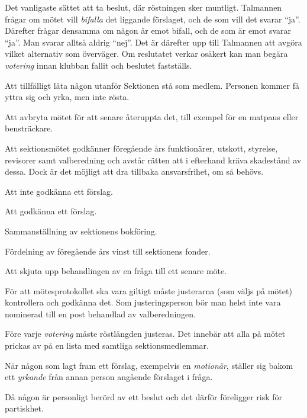 \documentclass[../_main/handlingar.tex]{subfiles}
\begin{document}
\begin{description}[style=multiline, leftmargin=45mm]
    \item[Acklamation]
    Det vanligaste sättet att ta beslut, där röstningen sker muntligt. Talmannen frågar om mötet vill \emph{bifalla} det liggande förslaget, och de som vill det svarar ``ja''. Därefter frågar densamma om någon är emot bifall, och de som är emot svarar ``ja''. Man svarar alltså aldrig ``nej''. Det är därefter upp till Talmannen att avgöra vilket alternativ som överväger. Om reslutatet verkar osäkert kan man begära \emph{votering} innan klubban fallit och beslutet fastställs.
    \item[Adjungera]
    Att tillfälligt låta någon utanför Sektionen stå som medlem. Personen kommer få yttra sig och yrka, men inte rösta.
    \item[Ajournera]
    Att avbryta mötet för att senare återuppta det, till exempel för en matpaus eller bensträckare.
    \item[Ansvarsfrihet]
    Att sektionsmötet godkänner föregående års funktionärer, utskott, styrelse, revisorer samt valberedning och avstår rätten att i efterhand kräva skadestånd av dessa. Dock är det möjligt att dra tillbaka ansvarsfrihet, om så behövs.
    \item[Avslag]
    Att inte godkänna ett förslag.
    \item[Bifall]
    Att godkänna ett förslag.
    \item[Bokslut]
    Sammanställning av sektionens bokföring.
    \item[Bokslutsdisposition]
    Fördelning av föregående års vinst till sektionens fonder.
    \item[Bordläggning]
    Att skjuta upp behandlingen av en fråga till ett senare möte.
    \item[Justering av protokoll]
    För att mötesprotokollet ska vara giltigt måste justerarna (som väljs på mötet) kontrollera och godkänna det. Som justeringsperson bör man helst inte vara nominerad till en post behandlad av valberedningen.
    \item[Justering av röstlängd]
    Före varje \emph{votering} måste röstlängden justeras. Det innebär att alla på mötet prickas av på en lista med samtliga sektionsmedlemmar.
    \item[Jämka sig] När någon som lagt fram ett förslag, exempelvis en \emph{motionär}, ställer sig bakom ett \emph{yrkande} från annan person angående förslaget i fråga.
    \item[Jäv]
    Då någon är personligt berörd av ett beslut och det därför föreligger risk för partiskhet.

\end{description}
\end{document}
